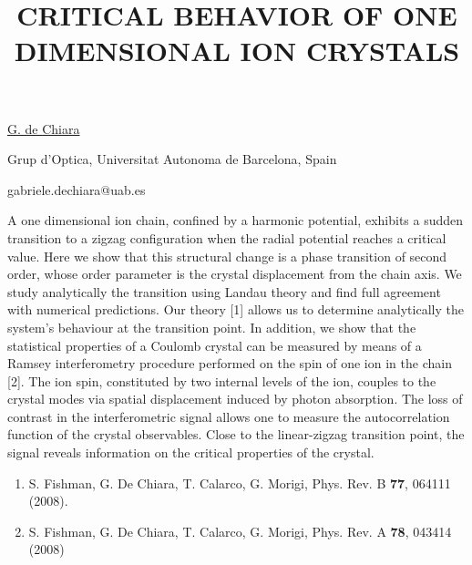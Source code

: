 \title{CRITICAL BEHAVIOR OF ONE DIMENSIONAL ION \mbox{CRYSTALS}}

\underline{G. de Chiara} 

{\normalsize{\vspace{-4mm}
Grup d'Optica, Universitat Autonoma de Barcelona, Spain

\email gabriele.dechiara@uab.es}}

A one dimensional ion chain, confined by a harmonic potential, exhibits a sudden transition to a zigzag configuration when the
radial potential reaches a critical value. Here we show that this structural change is a phase transition of second order, whose
order parameter is the crystal displacement from the chain axis. We study analytically the transition using Landau theory and
find full agreement with numerical predictions. Our theory [1] allows us to determine analytically the system's behaviour at the
transition point. In addition, we show that the statistical properties of a Coulomb crystal can be measured by means of a Ramsey
interferometry procedure performed on the spin of one ion in the chain [2]. The ion spin, constituted by two internal levels of
the ion, couples to the crystal modes via spatial displacement induced by photon absorption. The loss of contrast in the
interferometric signal allows one to measure the autocorrelation function of the crystal observables. Close to the linear-zigzag
transition point, the signal reveals information on the critical properties of the crystal.

\vspace{-4mm}
{\normalsize
\begin{enumerate}
\item S. Fishman, G. De Chiara, T. Calarco, G. Morigi, %
Phys. Rev. B \textbf{77}, 064111 (2008).
\item S. Fishman, G. De Chiara, T. Calarco, G. Morigi, %
Phys. Rev. A \textbf{78}, 043414 (2008)
\end{enumerate}
}

\vspace{\baselineskip}